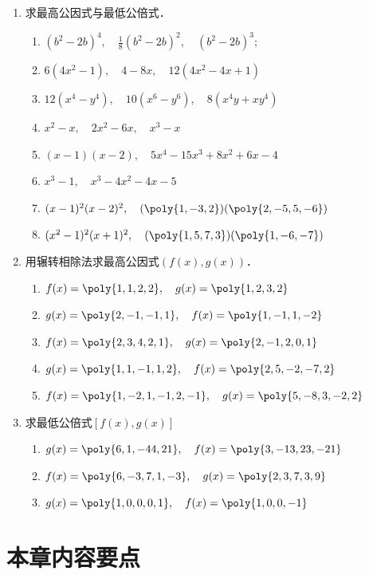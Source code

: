 \begin{enumerate}
\item 求最高公因式与最低公倍式．
\begin{enumerate}
\item $\left(b^{2}-2 b\right)^{4},\quad   \frac{1}{8}\left(b^{2}-2 b\right)^{2},\quad  \left(b^{2}-2 b\right)^{3} ;$
\item $6\left(4 x^{2}-1\right),\quad   4-8 x ,\quad   12\left(4 x^{2}-4 x + 1\right)$
\item $12\left(x^{4}-y^{4}\right),\quad   10\left(x^{6}-y^{6}\right),\quad   8\left(x^{4} y+x y^{4}\right)$
\item $x^{2}-x, \quad  2 x^{2}-6 x,\quad   x^{3}-x$
\item $(x-1)(x-2),\quad   5 x^{4}-15 x^{3}+8 x^{2}+6 x-4$
\item $x^{3}-1,\quad   x^{3}-4 x^{2}-4 x-5$
\item $(x-1)^{2}(x-2)^{2},\quad (\poly{1,-3,2})(\poly{2,-5,5,-6})$
\item $(x^2-1)^2(x+1)^2,\quad (\poly{1,5,7,3})(\poly{1,-6,-7})$
\end{enumerate}

\item 用辗转相除法求最高公因式$(f(x),g(x))$．
\begin{enumerate}
    \item $f(x)=\poly{1,1,2,2},\quad g(x)=\poly{1,2,3,2}$
    \item $g(x)=\poly{2,-1,-1,1},\quad f(x)=\poly{1,-1,1,-2}$
    \item $f(x)=\poly{2,3,4,2,1},\quad g(x)=\poly{2,-1,2,0,1}$
    \item $g(x)=\poly{1,1,-1,1,2},\quad f(x)=\poly{2,5,-2,-7,2}$
    \item $f(x)=\poly{1,-2,1,-1,2,-1},\quad g(x)=\poly{5,-8,3,-2,2}$
\end{enumerate}

\item 求最低公倍式$[f(x),g(x)]$
\begin{enumerate}
    \item $g(x)=\poly{6,1,-44,21},\quad f(x)=\poly{3,-13,23,-21}$
    \item $f(x)=\poly{6,-3,7,1,-3},\quad g(x)=\poly{2,3,7,3,9}$
    \item $g(x)=\poly{1,0,0,0,1},\quad f(x)=\poly{1,0,0,-1}$
\end{enumerate}

\end{enumerate}

\section*{本章内容要点}


